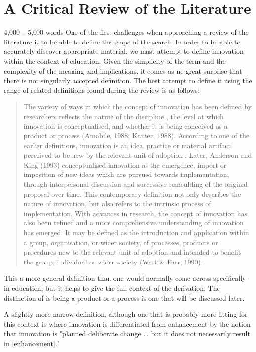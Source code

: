 \section{A Critical Review of the Literature}
4,000 – 5,000 words
One of the first challenges when approaching a review of the literature is to be able to define the scope of the search. In order to be able to accurately discover appropriate material, we must attempt to define innovation within the context of education. Given the simplicity of the term and the complexity of the meaning and implications, it comes as no great surprise that there is not singularly accepted definition. The best attempt to define it using the range of related definitions found during the review is as follows:

\begin{quote}
The variety of ways in which the concept of innovation has been defined by researchers reflects the nature of the discipline \cite{Gopalakrishnan_1994}, the level at which innovation is conceptualised, and whether it is being conceived as a product or process (Amabile, 1988; Kanter, 1988). According to one of the earlier definitions, innovation is an idea, practice or material artifact perceived to be new by the relevant unit of adoption \cite{Allen_1975}. Later, Anderson and King (1993) conceptualised innovation as the emergence, import or imposition of new ideas which are pursued towards implementation, through interpersonal discussion and successive remoulding of the original proposal over time. This contemporary definition not only describes the nature of innovation, but also refers to the intrinsic process of implementation. With advances in research, the concept of innovation has also been refined and a more comprehensive understanding of innovation has emerged. It may be defined as the introduction and application within a group, organisation, or wider society, of processes, products or procedures new to the relevant unit of adoption and intended to benefit the group, individual or wider society (West & Farr, 1990).
\end{quote}  \cite{Sharma_2005}

This a more general definition than one would normally come across specifically in education, but it helps to give the full context of the derivation. The distinction of is being a product or a process \cite{} is one that will be discussed later.

A slightly more narrow definition, although one that is probably more fitting for this context is where innovation is differentiated from enhancement by the notion that innovation is "planned deliberate change ... but it does not necessarily result in [enhancement]." \cite{hannan2002innovative}

